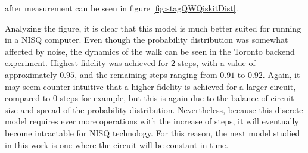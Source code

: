 \documentclass[../../dissertation.tex]{subfiles}
\begin{document}
after measurement can be seen in figure \ref{fig:stagQWQiskitDist}. 
\par
Analyzing the figure, it is clear that this model is much better suited for running in a NISQ computer. Even though the probability distribution was somewhat affected by noise, the dynamics of the walk can be seen in the Toronto backend experiment. Highest fidelity was achieved for $2$ steps, with a value of approximately $0.95$, and the remaining steps ranging from $0.91$ to $0.92$. Again, it may seem counter-intuitive that a higher fidelity is achieved for a larger circuit, compared to $0$ steps for example, but this is again due to the balance of circuit size and spread of the probability distribution. Nevertheless, because this discrete model requires ever more operations with the increase of steps, it will eventually become intractable for NISQ technology. For this reason, the next model studied in this work is one where the circuit will be constant in time.
\end{document}
